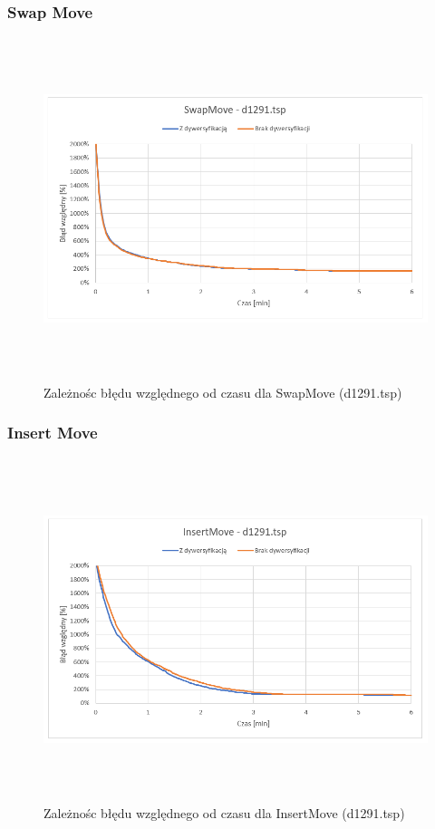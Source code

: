 \documentclass[a4paper,11pt]{article}
\begin{document}
\subsubsection{Swap Move}

\begin{figure}[H]
\centering
\includegraphics[height=10cm]{SwapMove1291.PNG}
\caption{Zależnośc błędu względnego od czasu dla SwapMove (d1291.tsp)}
\end{figure}

\subsubsection{Insert Move}

\begin{figure}[H]
\centering
\includegraphics[height=10cm]{InsertMove1291.PNG}
\caption{Zależnośc błędu względnego od czasu dla InsertMove (d1291.tsp)}
\end{figure}
\end{document}
